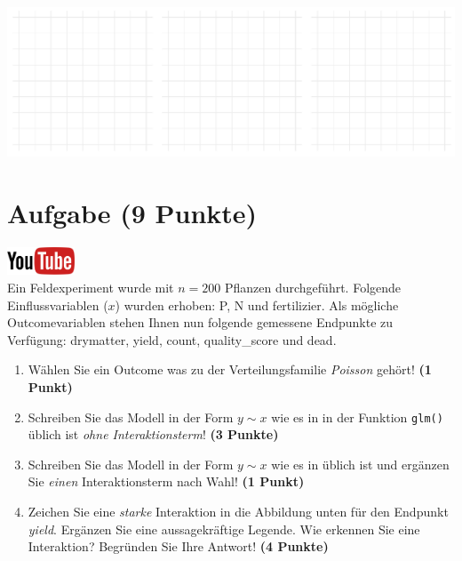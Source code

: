 \documentclass[a4paper, 10pt]{scrartcl}\usepackage[]{graphicx}\usepackage[]{xcolor}
\makeatletter
\def\maxwidth{ %
  \ifdim\Gin@nat@width>\linewidth
    \linewidth
  \else
    \Gin@nat@width
  \fi
}
\makeatother
\begin{document}
{\centering \includegraphics[width=\maxwidth]{img/regression-01-1} 

}



 
\clearpage

\section{Aufgabe \hfill (9 Punkte)}

\hfill\href{https://youtu.be/AwQEcQWLFCw}{\includegraphics[width =
  2cm]{img/youtube}}\\[1Ex]



Ein Feldexperiment wurde mit $n = 200$ Pflanzen durchgef{\"u}hrt. Folgende
Einflussvariablen ($x$) wurden erhoben: P, N und fertilizier. Als m{\"o}gliche Outcomevariablen stehen Ihnen nun
folgende gemessene Endpunkte zu Verf{\"u}gung: drymatter, yield, count, quality\_score und dead.

\begin{enumerate}
\item W{\"a}hlen Sie ein Outcome was zu der Verteilungsfamilie
  \textit{Poisson} geh{\"o}rt! \textbf{(1 Punkt)}
\item Schreiben Sie das Modell in der Form $y \sim x$ wie es in \Rlogo in
  der Funktion \texttt{glm()}
  {\"u}blich ist \textit{ohne Interaktionsterm}! \textbf{(3 Punkte)}
\item Schreiben Sie das Modell in der Form $y \sim x$ wie es in \Rlogo
  {\"u}blich ist und erg{\"a}nzen Sie \textit{einen} Interaktionsterm nach Wahl! \textbf{(1 Punkt)} 
\item Zeichen Sie eine \textit{starke}
  Interaktion in die Abbildung unten f{\"u}r den Endpunkt
  \textit{yield}. Erg{\"a}nzen Sie eine aussagekr{\"a}ftige Legende. Wie erkennen
  Sie eine Interaktion? Begr{\"u}nden Sie Ihre Antwort! \textbf{(4 Punkte)}
\end{enumerate}
\end{document}
